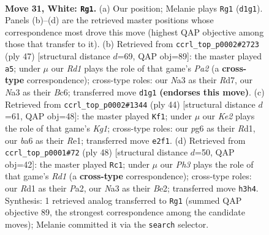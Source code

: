 \documentclass[11pt]{article}
\begin{document}
\clearpage

\begin{figure}[p]\centering
\begin{subfigure}{0.46\textwidth}\centering
\resizebox{\linewidth}{!}{%
\newchessgame
\chessboard[
  setfen={1r3r2/p4p1k/bpB1p1pp/2n5/2P5/N1B1P2P/PR2KPP1/3R4 w - - 7 31},
  showmover=false,
  pgfstyle=straightmove, color=movearrow, markmove={d1-g1}
]}
\caption{}
\end{subfigure}\hfill
\begin{subfigure}{0.46\textwidth}\centering
\resizebox{\linewidth}{!}{%
\newchessgame
\chessboard[
  setfen={1r3k2/p2r1pp1/2b2n2/2pp3p/5P1P/P1N1P3/1P1R1PB1/3R2K1 b - - 0 24},
  showmover=false,
  pgfstyle=straightmove, color=movearrow, markmove={a7-a5}
]}
\caption{}
\end{subfigure}
\\[4pt]
\begin{subfigure}{0.46\textwidth}\centering
\resizebox{\linewidth}{!}{%
\newchessgame
\chessboard[
  setfen={4r2r/ppk3pp/1bp2p2/4nB2/7B/2P5/PP3PPP/3RR1K1 w - - 1 23},
  showmover=false,
  pgfstyle=straightmove, color=movearrow, markmove={g1-f1}
]}
\caption{}
\end{subfigure}\hfill
\begin{subfigure}{0.46\textwidth}\centering
\resizebox{\linewidth}{!}{%
\newchessgame
\chessboard[
  setfen={rr3nk1/1p4pp/2p3b1/p3p3/4P3/1R1PB3/PP2B1PP/3R2K1 w - - 0 25},
  showmover=false,
  pgfstyle=straightmove, color=movearrow, markmove={d1-c1}
]}
\caption{}
\end{subfigure}
\caption{\textbf{Move 31, White: \texttt{Rg1}.} (a) Our position; Melanie plays \texttt{Rg1} (\texttt{d1g1}). Panels (b)--(d) are the retrieved master positions whose correspondence most drove this move (highest QAP objective among those that transfer to it). (b) Retrieved from \texttt{ccrl\_top\_p0002\#2723} (ply 47) [structural distance $d$=69, QAP obj=89]: the master played \texttt{a5}; under $\mu$ our \emph{Rd1} plays the role of that game's \emph{Pa2} (a \textbf{cross-type} correspondence); cross-type roles: our \emph{N}a3 as their \emph{R}d7, our \emph{N}a3 as their \emph{B}c6; transferred move \texttt{d1g1} \textbf{(endorses this move)}. (c) Retrieved from \texttt{ccrl\_top\_p0002\#1344} (ply 44) [structural distance $d$=61, QAP obj=48]: the master played \texttt{Kf1}; under $\mu$ our \emph{Ke2} plays the role of that game's \emph{Kg1}; cross-type roles: our \emph{p}g6 as their \emph{R}d1, our \emph{b}a6 as their \emph{R}e1; transferred move \texttt{e2f1}. (d) Retrieved from \texttt{ccrl\_top\_p0001\#72} (ply 48) [structural distance $d$=50, QAP obj=42]: the master played \texttt{Rc1}; under $\mu$ our \emph{Ph3} plays the role of that game's \emph{Rd1} (a \textbf{cross-type} correspondence); cross-type roles: our \emph{R}d1 as their \emph{P}a2, our \emph{N}a3 as their \emph{B}e2; transferred move \texttt{h3h4}. Synthesis: 1 retrieved analog transferred to \texttt{Rg1} (summed QAP objective 89, the strongest correspondence among the candidate moves); Melanie committed it via the \texttt{search} selector.}
\label{fig:thought-m60}
\end{figure}
\end{document}

